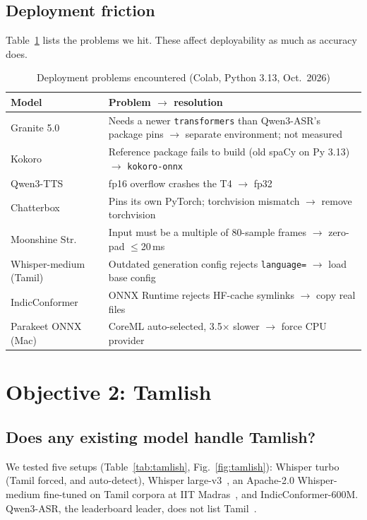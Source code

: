 \documentclass[conference]{IEEEtran}
\begin{document}
\subsection{Deployment friction}
Table~\ref{tab:friction} lists the problems we hit. These affect deployability as much as accuracy does.
\begin{table}[!t]
\caption{Deployment problems encountered (Colab, Python 3.13, Oct.\ 2026)}
\label{tab:friction}
\footnotesize
\begin{tabularx}{\columnwidth}{@{}l X@{}}
\toprule
\textbf{Model} & \textbf{Problem $\rightarrow$ resolution} \\
\midrule
Granite 5.0 & Needs a newer \texttt{transformers} than Qwen3-ASR's package pins $\rightarrow$ separate environment; not measured \\
Kokoro & Reference package fails to build (old spaCy on Py 3.13) $\rightarrow$ \texttt{kokoro-onnx}~\cite{gh_kokoroonnx} \\
Qwen3-TTS & fp16 overflow crashes the T4 $\rightarrow$ fp32 \\
Chatterbox & Pins its own PyTorch; torchvision mismatch $\rightarrow$ remove torchvision \\
Moonshine Str. & Input must be a multiple of 80-sample frames $\rightarrow$ zero-pad $\le$20\,ms \\
Whisper-medium (Tamil) & Outdated generation config rejects \texttt{language=} $\rightarrow$ load base config \\
IndicConformer & ONNX Runtime rejects HF-cache symlinks $\rightarrow$ copy real files \\
Parakeet ONNX (Mac) & CoreML auto-selected, 3.5$\times$ slower $\rightarrow$ force CPU provider \\
\bottomrule
\end{tabularx}
\end{table}

\section{Objective 2: Tamlish}
\label{sec:obj2}
\subsection{Does any existing model handle Tamlish?}
We tested five setups (Table~\ref{tab:tamlish}, Fig.~\ref{fig:tamlish}): Whisper turbo (Tamil forced, and auto-detect), Whisper large-v3~\cite{mc_whisperv3}, an Apache-2.0 Whisper-medium fine-tuned on Tamil corpora at IIT Madras~\cite{mc_whispertamil}, and IndicConformer-600M. Qwen3-ASR, the leaderboard leader, does not list Tamil~\cite{gh_qwen3asr}.
\end{document}
